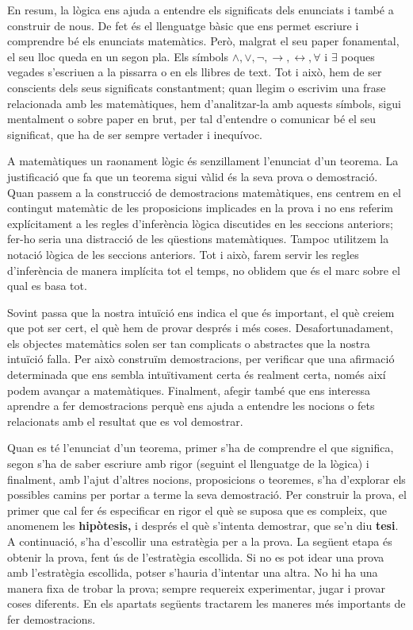 En resum, la lògica ens ajuda a entendre els significats dels enunciats
i també a construir de nous. De fet és el llenguatge bàsic que
ens permet escriure i comprendre bé els enunciats matemàtics. Però, malgrat el seu paper fonamental, el seu lloc queda en un segon pla.
Els símbols $\wedge,\vee,\lnot,\longrightarrow,\longleftrightarrow,\forall$ i $\exists$ poques vegades s'escriuen a la pissarra o en els
llibres de text. Tot i això, hem de ser conscients dels seus significats
constantment; quan llegim o escrivim una frase relacionada amb les matemàtiques, hem d'analitzar-la amb aquests símbols, sigui mentalment o
sobre paper en brut, per tal d'entendre o comunicar bé el seu
significat, que ha de ser sempre vertader i inequívoc.

\bigskip

A matemàtiques un raonament lògic és senzillament l'enunciat
d'un teorema. La justificació que fa que un teorema sigui vàlid és la seva prova o demostració. Quan passem a la construcció de
demostracions matemàtiques, ens centrem en el contingut matemàtic de
les proposicions implicades en la prova i no ens referim explícitament
a les regles d'inferència lògica discutides en les seccions
anteriors; fer-ho seria una distracció de les qüestions matemàtiques. Tampoc utilitzem la notació lògica de les seccions
anteriors. Tot i això, farem servir les regles d'inferència de
manera implícita tot el temps, no oblidem que és el marc sobre el
qual es basa tot.

Sovint passa que la nostra intuïció ens indica el que és
important, el què creiem que pot ser cert, el què hem de provar després i més coses. Desafortunadament, els objectes matemàtics solen
ser tan complicats o abstractes que la nostra intuïció falla. Per
això construïm demostracions, per verificar que una afirmació
determinada que ens sembla intuïtivament certa és realment certa,
només així podem avançar a matemàtiques. Finalment, afegir
també que ens interessa aprendre a fer demostracions perquè ens
ajuda a entendre les nocions o fets relacionats amb el resultat que es vol
demostrar.

\bigskip

Quan es té l'enunciat d'un teorema, primer s'ha de comprendre el que
significa, segon s'ha de saber escriure amb rigor (seguint el llenguatge de
la lògica) i finalment, amb l'ajut d'altres nocions, proposicions o
teoremes, s'ha d'explorar els possibles camins per portar a terme la seva
demostració. Per construir la prova, el primer que cal fer és
especificar en rigor el què se suposa que es compleix, que anomenem les
\textbf{hipòtesis, }i després el què s'intenta demostrar, que
se'n diu \textbf{tesi}. A continuació, s'ha d'escollir una estratègia per a la prova. La següent etapa és obtenir la prova, fent ús de l'estratègia escollida. Si no es pot idear una prova amb l'estratègia escollida, potser s'hauria d'intentar una altra. No hi ha una
manera fixa de trobar la prova; sempre requereix experimentar, jugar i
provar coses diferents. En els apartats següents tractarem les maneres més importants de fer demostracions.

